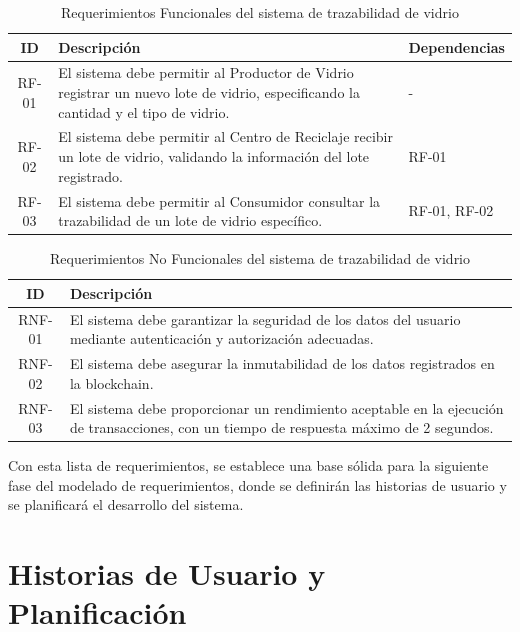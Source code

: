 \begin{table}[!htpb]
		\centering
		\caption{Requerimientos Funcionales del sistema de trazabilidad de vidrio}
		\label{tab:functional-requirements}
		\begin{tabular}{|c|p{8cm}|p{4cm}|}
				\hline
				\textbf{ID} & \textbf{Descripción} & \textbf{Dependencias} \\
				\hline
				RF-01 & El sistema debe permitir al Productor de Vidrio registrar un nuevo lote de vidrio, especificando la cantidad y el tipo de vidrio. & - \\
				RF-02 & El sistema debe permitir al Centro de Reciclaje recibir un lote de vidrio, validando la información del lote registrado. & RF-01 \\
				RF-03 & El sistema debe permitir al Consumidor consultar la trazabilidad de un lote de vidrio específico. & RF-01, RF-02 \\
				\hline
		\end{tabular}
\end{table}

\begin{table}[!htpb]
		\centering
		\caption{Requerimientos No Funcionales del sistema de trazabilidad de vidrio}
		\label{tab:non-functional-requirements}
		\begin{tabular}{|c|p{8cm}|}
				\hline
				\textbf{ID} & \textbf{Descripción} \\
				\hline
				RNF-01 & El sistema debe garantizar la seguridad de los datos del usuario mediante autenticación y autorización adecuadas. \\
				RNF-02 & El sistema debe asegurar la inmutabilidad de los datos registrados en la blockchain. \\
				RNF-03 & El sistema debe proporcionar un rendimiento aceptable en la ejecución de transacciones, con un tiempo de respuesta máximo de 2 segundos. \\
				\hline
		\end{tabular}
\end{table}

Con esta lista de requerimientos, se establece una base sólida para la siguiente fase del modelado de requerimientos, donde se definirán las historias de usuario y se planificará el desarrollo del sistema.
\section{Historias de Usuario y Planificación}
\label{sec:user-stories}

